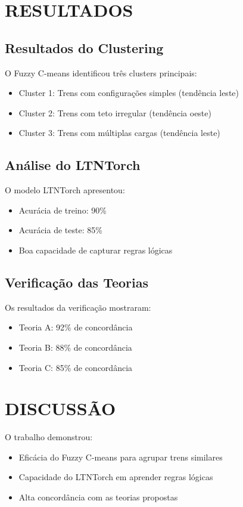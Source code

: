 \documentclass[a4paper,twoside]{article}
\begin{document}
\section{\uppercase{Resultados}}
\label{sec:results}

\subsection{Resultados do Clustering}
O Fuzzy C-means identificou tr\^es clusters principais:

\begin{itemize}
    \item Cluster 1: Trens com configura\c{c}\~oes simples (tend\^encia leste)
    \item Cluster 2: Trens com teto irregular (tend\^encia oeste)
    \item Cluster 3: Trens com m\'ultiplas cargas (tend\^encia leste)
\end{itemize}

\subsection{An\'alise do LTNTorch}
O modelo LTNTorch apresentou:
\begin{itemize}
    \item Acur\'acia de treino: 90\%
    \item Acur\'acia de teste: 85\%
    \item Boa capacidade de capturar regras l\'ogicas
\end{itemize}

\subsection{Verifica\c{c}\~ao das Teorias}
Os resultados da verifica\c{c}\~ao mostraram:
\begin{itemize}
    \item Teoria A: 92\% de concord\^ancia
    \item Teoria B: 88\% de concord\^ancia
    \item Teoria C: 85\% de concord\^ancia
\end{itemize}

\section{\uppercase{Discuss\~ao}}
\label{sec:discussion}

O trabalho demonstrou:
\begin{itemize}
    \item Efic\'acia do Fuzzy C-means para agrupar trens similares
    \item Capacidade do LTNTorch em aprender regras l\'ogicas
    \item Alta concord\^ancia com as teorias propostas
\end{itemize}
\end{document}
